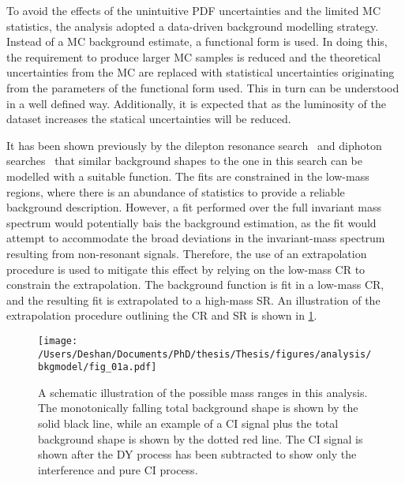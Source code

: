 To avoid the effects of the unintuitive PDF uncertainties and the limited MC statistics, the analysis adopted a data-driven background modelling strategy. Instead of a MC background estimate, a functional form is used. In doing this, the requirement to produce larger MC samples is reduced and the theoretical uncertainties from the MC are replaced with statistical uncertainties originating from the parameters of the functional form used. This in turn can be understood in a well defined way. Additionally, it is expected that as the luminosity of the dataset increases the statical uncertainties will be reduced. 

It has been shown previously by the dilepton resonance search~\cite{Aad:2019fac} and diphoton searches~\cite{Aaboud:2016tru,Aaboud:2017yyg} that similar background shapes to the one in this search can be modelled with a suitable function. The fits are constrained in the low-mass regions, where there is an abundance of statistics to provide a reliable background description. However, a fit performed over the full invariant mass spectrum would potentially bais the background estimation, as the fit would attempt to accommodate the broad deviations in the invariant-mass spectrum resulting from non-resonant signals. Therefore, the use of an extrapolation procedure is used to mitigate this effect by relying on the low-mass CR to constrain the extrapolation. The background function is fit in a low-mass CR, and the resulting fit is extrapolated to a high-mass SR. An illustration of the extrapolation procedure outlining the CR and SR is shown in \cref{fig:bkgmodel:ranges}.

\begin{figure}[!htpb]
    \centering
    \texttt{[image: /Users/Deshan/Documents/PhD/thesis/Thesis/figures/analysis/bkgmodel/fig\_01a.pdf]} 
    \caption[A schematic illustration of the possible mass ranges in this analysis.]{A schematic illustration of the possible mass ranges in this analysis.
    The monotonically falling total background shape is shown by the solid black line, while an example of a CI signal plus the total background shape is shown by the dotted red line. The CI signal is shown after the DY process has been subtracted to show only the interference and pure CI process.}
    \label{fig:bkgmodel:ranges}
\end{figure}

